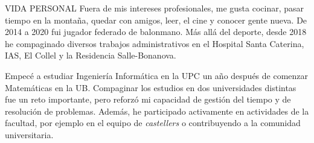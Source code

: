 \documentclass{resume} %
\begin{document}
\begin{rSection}{VIDA PERSONAL}
  Fuera de mis intereses profesionales, me gusta cocinar, pasar tiempo
  en la montaña, quedar con amigos, leer, el cine y conocer gente
  nueva. De 2014 a 2020 fui jugador federado de balonmano. Más allá del
  deporte, desde 2018 he compaginado diversos trabajos administrativos
  en el Hospital Santa Caterina, IAS, El Collel y la Residencia
  Salle-Bonanova.

  Empecé a estudiar Ingeniería Informática en la UPC un año después de
  comenzar Matemáticas en la UB. Compaginar los estudios en dos
  universidades distintas fue un reto importante, pero reforzó mi
  capacidad de gestión del tiempo y de resolución de problemas. Además,
  he participado activamente en actividades de la facultad, por ejemplo
  en el equipo de \emph{castellers} o contribuyendo a la comunidad
  universitaria.
\end{rSection}
\end{document}
